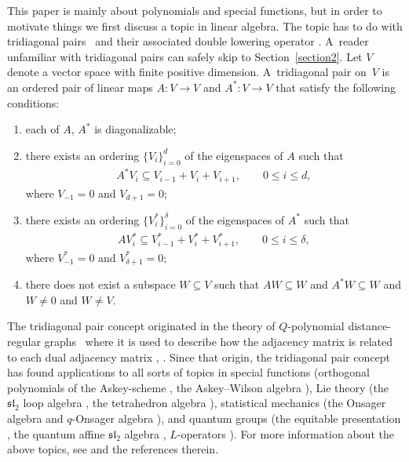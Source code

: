 \documentclass[pdftex]{sigma}
\numberwithin{equation}{section}
\begin{document}
This paper is mainly about polynomials and special functions,
but in order to motivate things we first discuss a topic in linear
algebra. The topic has to do with tridiagonal pairs~\cite{TD00}
and their associated double lowering operator
\cite{bockting1,bockting,bocktingQexp, bocktingTer}.
A~reader unfamiliar with tridiagonal pairs can safely skip to Section~\ref{section2}.
Let $V$ denote a vector space with finite positive dimension.
A~tridiagonal pair on~$V$
is an ordered pair of linear maps
$A\colon V\to V$
and $A^*\colon V\to V$ that satisfy the following conditions:
\begin{enumerate}\itemsep=0pt
\item[\rm (i)] each of $A$, $A^*$ is diagonalizable;
\item[\rm (ii)] there exists an ordering $\lbrace V_i\rbrace_{i=0}^d$ of the eigenspaces
of $A$ such that
\begin{gather*}
A^* V_i \subseteq V_{i-1} + V_i + V_{i+1}, \qquad 0 \leq i \leq d,
\end{gather*}
where $V_{-1}=0$ and $V_{d+1}=0$;
\item[\rm (iii)] there exists an ordering $\lbrace V^*_i\rbrace_{i=0}^\delta$
of the eigenspaces of $A^*$ such that
\begin{gather*}
A V^*_i \subseteq V^*_{i-1} + V^*_i + V^*_{i+1}, \qquad 0 \leq i \leq \delta,
\end{gather*}
where $V^*_{-1}=0$ and $V^*_{\delta+1}=0$;
\item[\rm (iv)] there does not exist a subspace $W \subseteq V$
such that
$AW \subseteq W$ and
$A^*W \subseteq W$ and
$W \not=0$ and
$W \not=V$.
\end{enumerate}
The tridiagonal pair concept originated
in the theory of $Q$-polynomial distance-regular graphs~\cite{bannaiIto,BCN} where it
is used to describe how the adjacency matrix is related to each
dual adjacency matrix
\cite[Example~1.4]{TD00},
\cite[Section~3]{tersub1}.
Since that origin,
the tridiagonal pair concept has found applications to
all sorts of topics in special functions (orthogonal polynomials of the
Askey-scheme
\cite{aw, koekoek, NomTerK, ter2004, ter2005},
the Askey--Wilson algebra
\cite{zhedmut,
univTer,
vidter, zhedhidden}),
Lie theory
(the ${\mathfrak {sl}}_2$ loop algebra
\cite{IT:Krawt},
 the tetrahedron algebra \cite{Ha,Ev}),
statistical mechanics (the Onsager algebra \cite{DateRoan2, HT} and $q$-Onsager algebra
 \cite{bas2, bas5,
 augmented,
 qSerre,
pospart,
qOnsUniv}),
and quantum groups (the equitable presentation
\cite{
alnajjar,
equit, uawe},
 the quantum affine
${\mathfrak {sl}}_2$ algebra
\cite{alnajjarC,tdanduq,
nonnil,tdqrac},
 $L$-operators
\cite{miki,terLop}).
For more information about the above topics, see
\cite{NomTerTB, madrid}
and the references therein.
\end{document}
